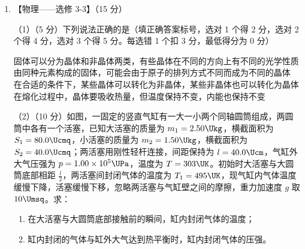 \documentclass[\gkver]{gaokaozhenti}
\begin{document}
\begin{enumerate}
{	木板右端离墙壁的最终距离为 $6.5\Um$。
}

\item
【物理——选修 3-3】（15 分）

（1）（5 分）下列说法正确的是（填正确答案标号，选对 1 个得 2 分，选对 2 个得 4 分，选对 3 个得 5 分。每选错 1 个扣 3 分，最低得分为 0 分）

{固体可以分为晶体和非晶体两类，有些晶体在不同的方向上有不同的光学性质}
{由同种元素构成的固体，可能会由于原子的排列方式不同而成为不同的晶体}
{在合适的条件下，某些晶体可以转化为非晶体，某些非晶体也可以转化为晶体}
{在熔化过程中，晶体要吸收热量，但温度保持不变，内能也保持不变}

（2）（10 分）如图，一固定的竖直气缸有一大一小两个同轴圆筒组成，两圆筒中各有一个活塞，已知大活塞的质量为 $m_{1}=2.50\Ukg$，横截面积为 $S_{1}=80.0\Ucmq$，小活塞的质量为 $m_{2}=1.50\Ukg$，横截面积为 $S_{2}=40.0\Ucmq$；两活塞用刚性轻杆连接，间距保持为 $l=40.0\Ucm$，气缸外大气压强为 $p=1.00\times10^{5}\UPa$，温度为 $T=303\UK$。初始时大活塞与大圆筒底部相距 $\frac{l}{2}$，两活塞间封闭气体的温度为 $T_{1}=495\UK$，现气缸内气体温度缓慢下降，活塞缓慢下移，忽略两活塞与气缸壁之间的摩擦，重力加速度 $g$ 取 $10\Umsq$。求：

\begin{enumerate}
	\item
	在大活塞与大圆筒底部接触前的瞬间，缸内封闭气体的温度；

	\item
	缸内封闭的气体与缸外大气达到热平衡时，缸内封闭气体的压强。
\end{enumerate}

\onepicture[align=right, w=2.13cm]{}

\end{enumerate}
\end{document}
